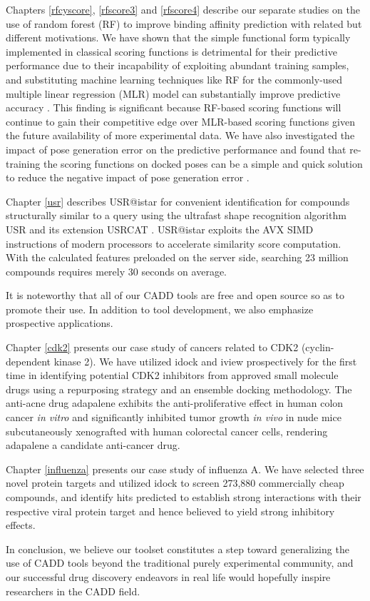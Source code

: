 Chapters \ref{rfcyscore}, \ref{rfscore3} and \ref{rfscore4} describe our separate studies \citep{1432,1433,1434} on the use of random forest (RF) to improve binding affinity prediction with related but different motivations. We have shown that the simple functional form typically implemented in classical scoring functions is detrimental for their predictive performance due to their incapability of exploiting abundant training samples, and substituting machine learning techniques like RF for the commonly-used multiple linear regression (MLR) model can substantially improve predictive accuracy \citep{1432,1433}. This finding is significant because RF-based scoring functions will continue to gain their competitive edge over MLR-based scoring functions given the future availability of more experimental data. We have also investigated the impact of pose generation error on the predictive performance and found that re-training the scoring functions on docked poses can be a simple and quick solution to reduce the negative impact of pose generation error \citep{1434}.

Chapter \ref{usr} describes USR@istar for convenient identification for compounds structurally similar to a query using the ultrafast shape recognition algorithm USR \citep{1379} and its extension USRCAT \citep{1331}. USR@istar exploits the AVX SIMD instructions of modern processors to accelerate similarity score computation. With the calculated features preloaded on the server side, searching 23 million compounds requires merely 30 seconds on average.

It is noteworthy that all of our CADD tools are free and open source so as to promote their use. In addition to tool development, we also emphasize prospective applications.

Chapter \ref{cdk2} presents our case study of cancers related to CDK2 (cyclin-dependent kinase 2). We have utilized idock \citep{1153,1362} and \citep{1366} iview prospectively for the first time in identifying potential CDK2 inhibitors from approved small molecule drugs using a repurposing strategy and an ensemble docking methodology. The anti-acne drug adapalene exhibits the anti-proliferative effect in human colon cancer \textit{in vitro} and significantly inhibited tumor growth \textit{in vivo} in nude mice subcutaneously xenografted with human colorectal cancer cells, rendering adapalene a candidate anti-cancer drug.

Chapter \ref{influenza} presents our case study of influenza A. We have selected three novel protein targets and utilized idock \citep{1153,1362} to screen 273,880 commercially cheap compounds, and identify hits predicted to establish strong interactions with their respective viral protein target and hence believed to yield strong inhibitory effects.

In conclusion, we believe our toolset constitutes a step toward generalizing the use of CADD tools beyond the traditional purely experimental community, and our successful drug discovery endeavors in real life would hopefully inspire researchers in the CADD field.

\chapterend
